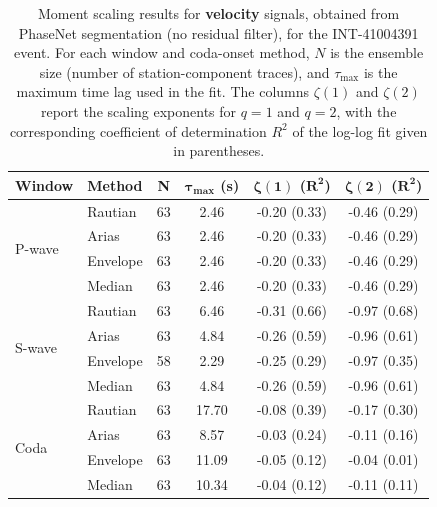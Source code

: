\begin{table}[H]
\centering
\small
\begin{tabular}{llcccc}
\toprule
\textbf{Window} & \textbf{Method} & \textbf{N} & $\bm{\tau_{\max}}$ \textbf{(s)} & $\bm{\zeta(1)}$ \textbf{(}$\bm{R^2}$\textbf{)} & $\bm{\zeta(2)}$ \textbf{(}$\bm{R^2}$\textbf{)} \\
\midrule
\multirow{4}{*}{P-wave}
& Rautian & 63 & 2.46 & -0.20 (0.33) & -0.46 (0.29) \\
& Arias & 63 & 2.46 & -0.20 (0.33) & -0.46 (0.29) \\
& Envelope & 63 & 2.46 & -0.20 (0.33) & -0.46 (0.29) \\
& Median & 63 & 2.46 & -0.20 (0.33) & -0.46 (0.29) \\
\midrule
\multirow{4}{*}{S-wave}
& Rautian & 63 & 6.46 & -0.31 (0.66) & -0.97 (0.68) \\
& Arias & 63 & 4.84 & -0.26 (0.59) & -0.96 (0.61) \\
& Envelope & 58 & 2.29 & -0.25 (0.29) & -0.97 (0.35) \\
& Median & 63 & 4.84 & -0.26 (0.59) & -0.96 (0.61) \\
\midrule
\multirow{4}{*}{Coda}
& Rautian & 63 & 17.70 & -0.08 (0.39) & -0.17 (0.30) \\
& Arias & 63 & 8.57 & -0.03 (0.24) & -0.11 (0.16) \\
& Envelope & 63 & 11.09 & -0.05 (0.12) & -0.04 (0.01) \\
& Median & 63 & 10.34 & -0.04 (0.12) & -0.11 (0.11) \\
\bottomrule
\end{tabular}
\caption{Moment scaling results for \textbf{velocity} signals, obtained from PhaseNet segmentation (no residual filter), for the INT-41004391 event. For each window and coda-onset method, $N$ is the ensemble size (number of station-component traces), and $\tau_{\max}$ is the maximum time lag used in the fit. The columns $\zeta(1)$ and $\zeta(2)$ report the scaling exponents for $q=1$ and $q=2$, with the corresponding coefficient of determination $R^2$ of the log-log fit given in parentheses.}
\label{tab:phasenet_scaling_vel_nothresh_queyras}
\end{table}